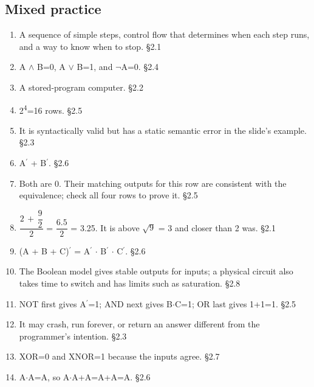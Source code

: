 \documentclass[11pt]{article}
\begin{document}
\begin{keepsection}\subsection{Mixed practice}

\begin{enumerate}
\item A sequence of simple steps, control flow that determines when each step runs, and a way to know when to stop. \hfill{\small\color{FAUblue}§2.1}
\item A \ensuremath{\land} B=0, A \ensuremath{\lor} B=1, and \ensuremath{\neg}A=0. \hfill{\small\color{FAUblue}§2.4}
\item A stored-program computer. \hfill{\small\color{FAUblue}§2.2}
\item 2\textsuperscript{4}=16 rows. \hfill{\small\color{FAUblue}§2.5}
\item It is syntactically valid but has a static semantic error in the slide's example. \hfill{\small\color{FAUblue}§2.3}
\item A\ensuremath{{}^{\prime}} + B\ensuremath{{}^{\prime}}. \hfill{\small\color{FAUblue}§2.6}
\item Both are 0. Their matching outputs for this row are consistent with the equivalence; check all four rows to prove it. \hfill{\small\color{FAUblue}§2.5}
\item {\small\ensuremath{\dfrac{2\, +\, \dfrac{9}{2}}{2}}} = {\small\ensuremath{\dfrac{6.5}{2}}} = 3.25. It is above \ensuremath{\sqrt{9}} = 3 and closer than 2 was. \hfill{\small\color{FAUblue}§2.1}
\item (A + B + C)\ensuremath{{}^{\prime}} = A\ensuremath{{}^{\prime}} \ensuremath{\cdot} B\ensuremath{{}^{\prime}} \ensuremath{\cdot} C\ensuremath{{}^{\prime}}. \hfill{\small\color{FAUblue}§2.6}
\item The Boolean model gives stable outputs for inputs; a physical circuit also takes time to switch and has limits such as saturation. \hfill{\small\color{FAUblue}§2.8}
\item NOT first gives A\ensuremath{{}^{\prime}}=1; AND next gives B\ensuremath{\cdot}C=1; OR last gives 1+1=1. \hfill{\small\color{FAUblue}§2.5}
\item It may crash, run forever, or return an answer different from the programmer's intention. \hfill{\small\color{FAUblue}§2.3}
\item XOR=0 and XNOR=1 because the inputs agree. \hfill{\small\color{FAUblue}§2.7}
\item A\ensuremath{\cdot}A=A, so A\ensuremath{\cdot}A+A=A+A=A. \hfill{\small\color{FAUblue}§2.6}

\end{enumerate}
\end{keepsection}
\end{document}
